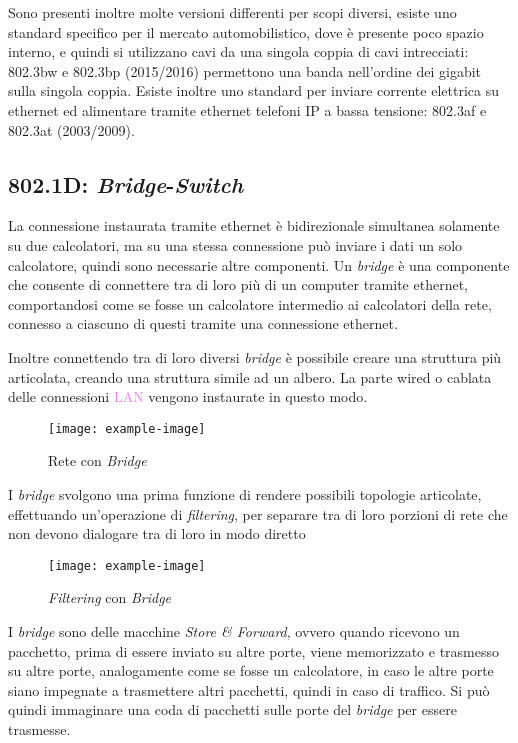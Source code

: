 \documentclass{article}
\numberwithin{equation}{subsection}
\begin{document}
Sono presenti inoltre molte versioni differenti per scopi diversi, esiste uno standard specifico per il mercato automobilistico, dove è presente poco spazio interno, e quindi si utilizzano cavi da una singola coppia 
di cavi intrecciati: 802.3bw e 802.3bp (2015/2016) permettono una banda nell'ordine dei gigabit sulla singola coppia. Esiste inoltre uno standard per inviare corrente elettrica su ethernet ed alimentare tramite 
ethernet telefoni \textcolor{Bittersweet}{IP} a bassa tensione: 802.3af e 802.3at (2003/2009). 

\subsection{802.1D: \textit{Bridge}-\textit{Switch}}

La connessione instaurata tramite ethernet è bidirezionale simultanea solamente su due calcolatori, ma su una stessa connessione può inviare i dati un solo 
calcolatore, quindi sono necessarie altre componenti. Un \textit{bridge} è una componente che consente di connettere tra di loro più di un computer 
tramite ethernet, comportandosi come se fosse un calcolatore intermedio ai calcolatori della rete, connesso a ciascuno di questi tramite una connessione 
ethernet. 

Inoltre connettendo tra di loro diversi \textit{bridge} è possibile creare una struttura più articolata, creando una struttura simile ad un albero. La 
parte wired o cablata delle connessioni \textcolor{violet}{LAN} vengono instaurate in questo modo. 

\begin{figure}[H]%
    \centering%
    \texttt{[image: example-image]}%
    \caption{Rete con \textit{Bridge}}%
\end{figure}

I \textit{bridge} svolgono una prima funzione di rendere possibili topologie articolate, effettuando un'operazione di \textit{filtering}, per separare tra di loro porzioni di rete che 
non devono dialogare tra di loro in modo diretto


\begin{figure}[H]%
    \centering%
    \texttt{[image: example-image]}%
    \caption{\textit{Filtering} con \textit{Bridge}}%
\end{figure}

I \textit{bridge} sono delle macchine \textit{Store \& Forward}, ovvero quando ricevono un pacchetto, prima di essere inviato su altre porte, viene 
memorizzato e trasmesso su altre porte, analogamente come se fosse un calcolatore, in caso le altre porte siano impegnate a trasmettere altri 
pacchetti, quindi in caso di traffico. Si può quindi immaginare una coda di pacchetti sulle porte del \textit{bridge} per essere trasmesse. 
\end{document}
